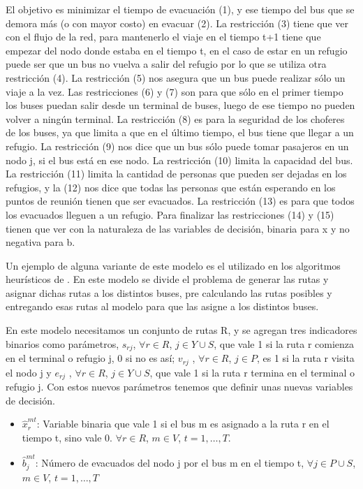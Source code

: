 \documentclass[letter, 10pt]{article}
\begin{document}
El objetivo es minimizar el tiempo de evacuación (1), y ese tiempo del bus que se demora más (o con mayor costo) en evacuar (2). La restricción (3) tiene que ver con el flujo de la red, para mantenerlo el viaje en el tiempo t+1 tiene que empezar del nodo donde estaba en el tiempo t, en el caso de estar en un refugio puede ser que un bus no vuelva a salir del refugio por lo que se utiliza otra restricción (4). La restricción (5) nos asegura que un bus puede realizar sólo un viaje a la vez. Las restricciones (6) y (7) son para que sólo en el primer tiempo los buses puedan salir desde un terminal de buses, luego de ese tiempo no pueden volver a ningún terminal. La restricción (8) es para la seguridad de los choferes de los buses, ya que limita a que en el último tiempo, el bus tiene que llegar a un refugio. La restricción (9) nos dice que un bus sólo puede tomar pasajeros en un nodo j, si el bus está en ese nodo. La restricción (10) limita la capacidad del bus. La restricción (11) limita la cantidad de personas que pueden ser dejadas en los refugios, y la (12) nos dice que todas las personas que están esperando en los puntos de reunión tienen que ser evacuados. La restricción (13) es para que todos los evacuados lleguen a un refugio. Para finalizar las restricciones (14) y (15) tienen que ver con la naturaleza de las variables de decisión, binaria para x y no negativa para b. 

Un ejemplo de alguna variante de este modelo es el utilizado en los algoritmos heurísticos de \cite{bish2011planning}. En este modelo se divide el problema de generar las rutas y asignar dichas rutas a los distintos buses, pre calculando las rutas posibles y entregando esas rutas al modelo para que las asigne a los distintos buses.

En este modelo necesitamos un conjunto de rutas R, y se agregan tres indicadores binarios como parámetros, $s_{rj}$, $\forall r \in R$, $j \in Y \cup S$, que vale 1 si la ruta r comienza en el terminal o refugio j, 0 si no es así; $v_{rj}$ , $\forall r \in R$, $j \in P$, es 1 si la ruta r visita el nodo j y $e_{rj}$ , $\forall r \in R$, $j \in Y\cup S$, que vale 1 si la ruta r termina en el terminal o refugio j. Con estos nuevos parámetros tenemos que definir unas nuevas variables de decisión.

\begin{itemize}
\item $\hat{x}_r^{mt}$: Variable binaria que vale 1 si el bus m es asignado a la ruta r en el tiempo t, sino vale 0. $\forall r \in R$, $m\in V$, $t = 1, \dots,T$.
\item $\hat{b}_j^{mt}$: Número de evacuados del nodo j por el bus m en el tiempo t, $\forall j \in P \cup S$, $m \in V$, $t = 1,\dots,T$
\end{itemize}
\end{document}
